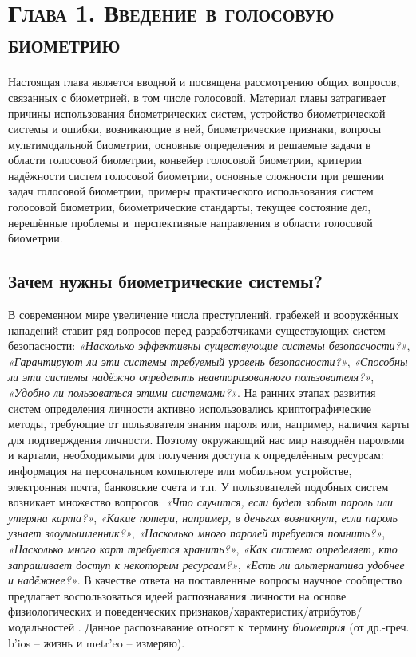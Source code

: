 \documentclass[12pt]{book}
\newcommand{\textgreek}[1]{\begingroup\fontencoding{LGR}\selectfont#1\endgroup}
\begin{document}
\chapter*{\textsc{Глава 1. Введение в голосовую биометрию}}

\thispagestyle{fancy}

\large{Настоящая глава является вводной и посвящена рассмотрению общих вопросов, связанных с биометрией, в том числе голосовой. Материал главы затрагивает причины использования биометрических систем, устройство биометрической системы и ошибки, возникающие в ней, биометрические признаки, вопросы мультимодальной биометрии, основные определения и решаемые задачи в области голосовой биометрии, конвейер голосовой биометрии, критерии надёжности систем голосовой биометрии, основные сложности при решении задач голосовой биометрии, примеры практического использования систем голосовой биометрии, биометрические стандарты, текущее состояние дел, нерешённые проблемы и~перспективные направления в области голосовой биометрии.}

\section{Зачем нужны биометрические системы?}
\label{sec:section_1_1}

\large{В современном мире увеличение числа преступлений, грабежей и вооружённых нападений ставит ряд вопросов перед разработчиками существующих систем безопасности: \textit{«Насколько эффективны существующие системы безопасности?»}, \textit{«Гарантируют ли эти системы требуемый уровень безопасности?»}, \textit{«Способны ли эти системы надёжно определять неавторизованного пользователя?»}, \textit{«Удобно ли пользоваться этими системами?»}. На ранних этапах развития систем определения личности активно использовались криптографические методы, требующие от пользователя знания пароля или, например, наличия карты для подтверждения личности. Поэтому окружающий нас мир наводнён паролями и картами, необходимыми для получения доступа к определённым ресурсам: информация на персональном компьютере или мобильном устройстве, электронная почта, банковские счета и т.п. У пользователей подобных систем возникает множество вопросов:  \textit{«Что случится, если будет забыт пароль или утеряна карта?»}, \textit{«Какие потери, например, в деньгах возникнут, если пароль узнает злоумышленник?»}, \textit{«Насколько много паролей требуется помнить?»}, \textit{«Насколько много карт требуется хранить?»}, \textit{«Как система определяет, кто запрашивает доступ к некоторым ресурсам?»}, \textit{«Есть ли альтернатива удобнее и надёжнее?»}. В качестве ответа на поставленные вопросы научное сообщество предлагает воспользоваться идеей распознавания личности на основе физиологических и поведенческих признаков/характеристик/атрибутов/модальностей \cite{unar_2014}. Данное распознавание относят к~термину \textit{биометрия} (от др.-греч. \textgreek{b'ios} -- жизнь и \textgreek{metr'eo} -- измеряю).}
\end{document}
